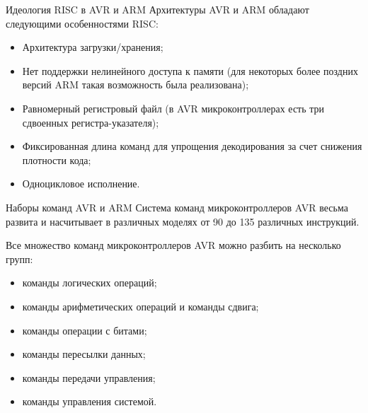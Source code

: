 \documentclass[12pt,a4paper,mathserif]{beamer}
\begin{document}
\begin{frame}{Идеология RISC в AVR и ARM}
    \setlength{\parindent}{0.5cm}
    Архитектуры AVR и ARM обладают следующими особенностями RISC:
    
    \begin{itemize}
        \item Архитектура загрузки/хранения;
    
        \item Нет поддержки нелинейного доступа к памяти (для некоторых более поздних версий ARM такая возможность была реализована);
    
        \item Равномерный регистровый файл (в AVR микроконтроллерах есть три сдвоенных регистра-указателя);
    
        \item Фиксированная длина команд для упрощения декодирования за счет снижения плотности кода;
    
        \item Одноцикловое исполнение.
    \end{itemize}
\end{frame}

\begin{frame}{Наборы команд AVR и ARM}
    \setlength{\parindent}{0.5cm}
    Система команд микроконтроллеров AVR весьма развита и насчитывает в различных моделях от 90 до 135 различных инструкций.
    
    Все множество команд микроконтроллеров AVR можно разбить на несколько групп:
    
    \begin{itemize}
        \item команды логических операций;
    
        \item команды арифметических операций и команды сдвига;
    
        \item команды операции с битами;
    
        \item команды пересылки данных;
    
        \item команды передачи управления;
    
        \item команды управления системой.
    \end{itemize}
\end{frame}
\end{document}
